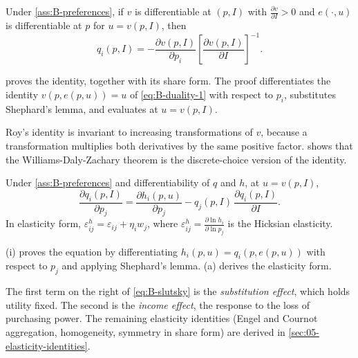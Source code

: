 \begin{proposition}\label{prop:B-roy}
Under \cref{ass:B-preferences}, if $v$ is differentiable at $(p, I)$ with $\frac{\partial v}{\partial I} > 0$
and $e(\cdot, u)$ is differentiable at $p$ for $u = v(p, I)$, then
\begin{equation}\label{eq:B-roy}
q_i(p, I) = -\frac{\partial v(p, I)}{\partial p_i}\left[\frac{\partial v(p, I)}{\partial I}\right]^{-1}.
\end{equation}
\end{proposition}

 proves the identity, together with its share form. The proof differentiates the identity
$v(p, e(p, u)) = u$ of \eqref{eq:B-duality-1} with respect to $p_i$, substitutes Shephard's lemma, and
evaluates at $u = v(p, I)$.

Roy's identity is invariant to increasing transformations of $v$, because a transformation multiplies both
derivatives by the same positive factor.  shows that the Williams-Daly-Zachary theorem is
the discrete-choice version of the identity.

\begin{proposition}\label{prop:B-slutsky}
Under \cref{ass:B-preferences} and differentiability of $q$ and $h$, at $u = v(p, I)$,
\begin{equation}\label{eq:B-slutsky}
\frac{\partial q_i(p, I)}{\partial p_j} = \frac{\partial h_i(p, u)}{\partial p_j} - q_j(p, I)\,\frac{\partial q_i(p, I)}{\partial I} .
\end{equation}
In elasticity form, $\varepsilon^h_{ij} = \varepsilon_{ij} + \eta_iw_j$, where
$\varepsilon^h_{ij} = \frac{\partial\ln h_i}{\partial\ln p_j}$ is the Hicksian elasticity.
\end{proposition}

(i) proves the equation by differentiating $h_i(p, u) = q_i(p, e(p, u))$ with respect to
$p_j$ and applying Shephard's lemma. (a) derives the elasticity form.

The first term on the right of \eqref{eq:B-slutsky} is the \emph{substitution effect}, which holds utility
fixed. The second is the \emph{income effect}, the response to the loss of purchasing power. The remaining
elasticity identities (Engel and Cournot aggregation, homogeneity, symmetry in share form) are derived in
\cref{sec:05-elasticity-identities}.

